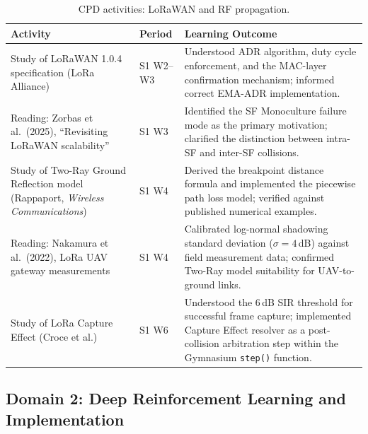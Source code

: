 \begin{table}[H]
\centering
\caption{CPD activities: LoRaWAN and RF propagation.}
\label{tab:cpd_lorawan}
\begin{tabularx}{\textwidth}{p{3.5cm} p{2cm} X}
\toprule
\textbf{Activity} & \textbf{Period} & \textbf{Learning Outcome} \\
\midrule
Study of LoRaWAN 1.0.4 specification (LoRa Alliance) & S1 W2--W3 & Understood ADR algorithm, duty cycle enforcement, and the MAC-layer confirmation mechanism; informed correct EMA-ADR implementation. \\
\midrule
Reading: Zorbas et al.\ (2025), ``Revisiting LoRaWAN scalability'' & S1 W3 & Identified the SF Monoculture failure mode as the primary motivation; clarified the distinction between intra-SF and inter-SF collisions. \\
\midrule
Study of Two-Ray Ground Reflection model (Rappaport, \textit{Wireless Communications}) & S1 W4 & Derived the breakpoint distance formula and implemented the piecewise path loss model; verified against published numerical examples. \\
\midrule
Reading: Nakamura et al.\ (2022), LoRa UAV gateway measurements & S1 W4 & Calibrated log-normal shadowing standard deviation ($\sigma = 4$\,dB) against field measurement data; confirmed Two-Ray model suitability for UAV-to-ground links. \\
\midrule
Study of LoRa Capture Effect (Croce et al.) & S1 W6 & Understood the 6\,dB SIR threshold for successful frame capture; implemented Capture Effect resolver as a post-collision arbitration step within the Gymnasium \texttt{step()} function. \\
\bottomrule
\end{tabularx}
\end{table}

\subsection*{Domain 2: Deep Reinforcement Learning and Implementation}

